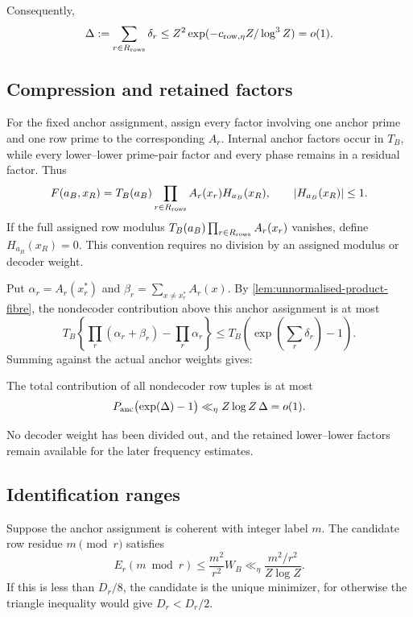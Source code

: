 Consequently,
\begin{equation}
\label{eq:Delta-row}
 \Delta:=\sum_{r\in R_{\rm rows}}\delta_r
 \leq Z^2\exp(-c_{\rm row,\eta}Z/\log^3Z)=o(1).
\end{equation}

\subsection{Compression and retained factors}

For the fixed anchor assignment, assign every factor involving one anchor prime and one row prime to the corresponding $A_r$. Internal anchor factors occur in $T_B$, while every lower--lower prime-pair factor and every phase remains in a residual factor. Thus
\begin{equation}
\label{eq:concrete-fibre-factorization}
 F(a_B,x_R)=T_B(a_B)\prod_{r\in R_{\rm rows}}A_r(x_r)H_{a_B}(x_R),
 \qquad |H_{a_B}(x_R)|\leq1.
\end{equation}
If the full assigned row modulus $T_B(a_B)\prod_{r\in R_{\rm rows}}A_r(x_r)$ vanishes, define $H_{a_B}(x_R)=0$. This convention requires no division by an assigned modulus or decoder weight.

Put $\alpha_r=A_r(x_r^*)$ and $\beta_r=\sum_{x\neq x_r^*}A_r(x)$. By \cref{lem:unnormalised-product-fibre}, the nondecoder contribution above this anchor assignment is at most
\[
 T_B\left\{\prod_r(\alpha_r+\beta_r)-\prod_r\alpha_r\right\}
 \leq T_B\left(\exp\left(\sum_r\delta_r\right)-1\right).
\]
Summing against the actual anchor weights gives:

\begin{proposition}
\label{prop:global-fibre-error}
The total contribution of all nondecoder row tuples is at most
\begin{equation}
\label{eq:global-fibre-error}
 P_{\rm anc}\bigl(\exp(\Delta)-1\bigr)
 \ll_\eta Z\log Z\,\Delta=o(1).
\end{equation}
\end{proposition}

No decoder weight has been divided out, and the retained lower--lower factors remain available for the later frequency estimates.

\subsection{Identification ranges}

Suppose the anchor assignment is coherent with integer label $m$. The candidate row residue $m\pmod r$ satisfies
\begin{equation}
\label{eq:candidate-row-energy}
 E_r(m\bmod r)\leq\frac{m^2}{r^2}W_B\ll_\eta\frac{m^2/r^2}{Z\log Z}.
\end{equation}
If this is less than $D_r/8$, the candidate is the unique minimizer, for otherwise the triangle inequality would give $D_r< D_r/2$.


